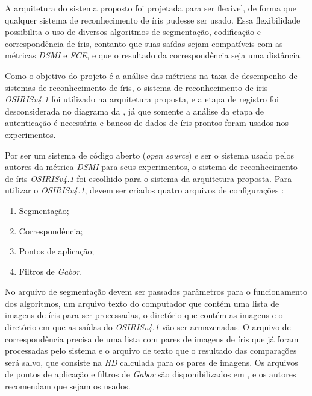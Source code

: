 \par A arquitetura do sistema proposto foi projetada para ser flexível, de forma que qualquer sistema de reconhecimento de íris pudesse ser usado. Essa flexibilidade possibilita o uso de diversos algoritmos de segmentação, codificação e correspondência de íris, contanto que suas saídas sejam compatíveis com as métricas \textit{\acrshort{DSMI}} e \textit{\acrshort{FCE}}, e que o resultado da correspondência seja uma distância.

\par Como o objetivo do projeto é a análise das métricas na taxa de desempenho de sistemas de reconhecimento de íris, o sistema de reconhecimento de íris \textit{OSIRISv4.1} \cite{othman2015, osirisv41, osirisv41_doc} foi utilizado na arquitetura proposta, e a etapa de registro foi desconsiderada no diagrama da , já que somente a análise da etapa de autenticação é necessária e bancos de dados de íris prontos foram usados nos experimentos.


\par Por ser um sistema de código aberto (\textit{open source}) e ser o sistema usado pelos autores da métrica \textit{\acrshort{DSMI}} \cite{Jenadeleh_2018_CVPR_Workshops} para seus experimentos, o sistema de reconhecimento de íris \textit{OSIRISv4.1} foi escolhido para o sistema da arquitetura proposta. Para utilizar o \textit{OSIRISv4.1}, devem ser criados quatro arquivos de configurações \cite{osirisv41_doc}:

\begin{enumerate}
    \item Segmentação;
    \item Correspondência;
    \item Pontos de aplicação;
    \item Filtros de \textit{Gabor}.
\end{enumerate}

\par No arquivo de segmentação devem ser passados parâmetros para o funcionamento dos algoritmos, um arquivo texto do computador que contém uma lista de imagens de íris para ser processadas, o diretório que contém as imagens e o diretório em que as saídas do \textit{OSIRISv4.1} vão ser armazenadas. O arquivo de correspondência precisa de uma lista com pares de imagens de íris que já foram processadas pelo sistema e o arquivo de texto que o resultado das comparações será salvo, que consiste na \textit{\acrshort{HD}} calculada para os pares de imagens. Os arquivos de pontos de aplicação e filtros de \textit{Gabor} são disponibilizados em \cite{osirisv41}, e os autores recomendam que sejam os usados.

